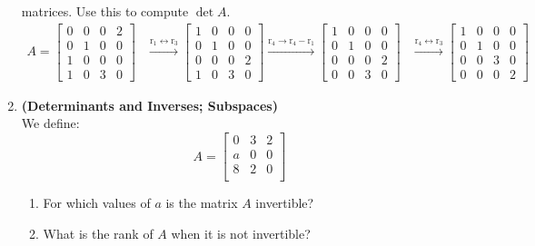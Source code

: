 \documentclass[red]{tutorial}
\newcommand{\row}[1]{\mathrm{r}_{#1}}
\newcommand{\mat}[1]{\begin{bmatrix} #1 %
\end{bmatrix}}
\theoremstyle{definition}
\theoremstyle{theorem}
\begin{document}
\begin{tutorial}
\begin{enumerate}
      matrices. Use this to compute $\det A$.
      \begin{align*}
        A = \begin{bmatrix}
          0 & 0 & 0 & 2 \\
          0 & 1 & 0 & 0 \\
          1 & 0 & 0 & 0 \\
          1 & 0 & 3 & 0
        \end{bmatrix}
        &\xrightarrow{\row{1} \leftrightarrow \row{3}}
        \begin{bmatrix}
          1 & 0 & 0 & 0 \\
          0 & 1 & 0 & 0 \\
          0 & 0 & 0 & 2 \\
          1 & 0 & 3 & 0
        \end{bmatrix}
        \xrightarrow{\row{4} \to \row{4}-\row{1}}
        \begin{bmatrix}
          1 & 0 & 0 & 0 \\
          0 & 1 & 0 & 0 \\
          0 & 0 & 0 & 2 \\
          0 & 0 & 3 & 0
        \end{bmatrix}
        &\xrightarrow{\row{4} \leftrightarrow \row{3}}
        \begin{bmatrix}
          1 & 0 & 0 & 0 \\
          0 & 1 & 0 & 0 \\
          0 & 0 & 3 & 0 \\
          0 & 0 & 0 & 2
        \end{bmatrix}
      \end{align*}
      \pagebreak %
    \item \label{q:determinants} \textbf{(Determinants and Inverses; Subspaces)}\\
      We define:
      \begin{equation*}
        A =
        \mat{
        0 & 3 & 2 \\
        a & 0 & 0 \\
        8 & 2 & 0 \\
        }
      \end{equation*}
      \begin{enumerate}
        \item For which values of $a$ is the matrix $A$ invertible?
        \item What is the rank of $A$ when it is not invertible?

\end{enumerate}
\end{enumerate}
\end{tutorial}
\end{document}
